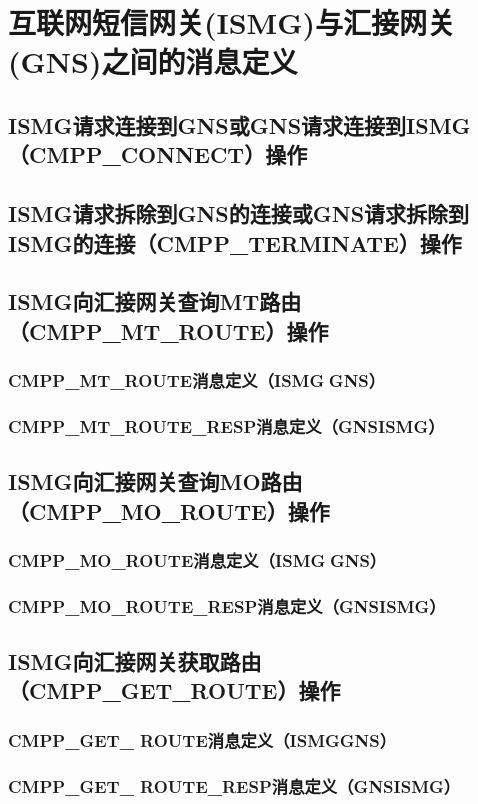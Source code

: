 \documentclass[11pt]{book} %
\begin{document}
\section{互联网短信网关(ISMG)与汇接网关(GNS)之间的消息定义}
\subsection{ISMG请求连接到GNS或GNS请求连接到ISMG（CMPP\_CONNECT）操作}
\subsection{ISMG请求拆除到GNS的连接或GNS请求拆除到ISMG的连接（CMPP\_TERMINATE）操作}
\subsection{ISMG向汇接网关查询MT路由（CMPP\_MT\_ROUTE）操作}
\subsubsection{CMPP\_MT\_ROUTE消息定义（ISMGGNS）}
\subsubsection{CMPP\_MT\_ROUTE\_RESP消息定义（GNS\textrightarrow ISMG）}
\subsection{ISMG向汇接网关查询MO路由（CMPP\_MO\_ROUTE）操作}
\subsubsection{CMPP\_MO\_ROUTE消息定义（ISMGGNS）}
\subsubsection{CMPP\_MO\_ROUTE\_RESP消息定义（GNS\textrightarrow ISMG）}
\subsection{ISMG向汇接网关获取路由（CMPP\_GET\_ROUTE）操作}
\subsubsection{CMPP\_GET\_ ROUTE消息定义（ISMG\textrightarrow GNS）}
\subsubsection{CMPP\_GET\_ ROUTE\_RESP消息定义（GNS\textrightarrow ISMG）}
\end{document}
